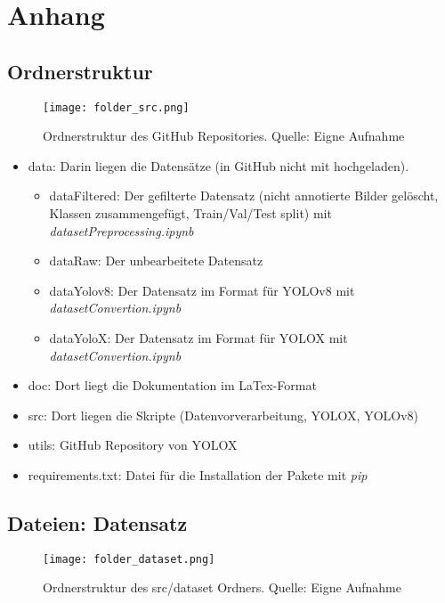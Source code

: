 \chapter{Anhang}\label{chap:appendix}
\section{Ordnerstruktur}
\begin{figure}[h]
	\centering
	\texttt{[image: folder\_src.png]}
	\caption[Ordnerstruktur des GitHub Repositories]{Ordnerstruktur des GitHub Repositories. Quelle: Eigne Aufnahme}
\end{figure}

\begin{itemize}
	\item data: Darin liegen die Datensätze (in GitHub nicht mit hochgeladen).
	\begin{itemize}
		\item dataFiltered: Der gefilterte Datensatz (nicht annotierte Bilder gelöscht, Klassen zusammengefügt, Train/Val/Test split) mit \textit{datasetPreprocessing.ipynb}
		\item dataRaw: Der unbearbeitete Datensatz \cite{datasetSelfDrivingCar}
		\item dataYolov8: Der Datensatz im Format für YOLOv8 mit \textit{datasetConvertion.ipynb}
		\item dataYoloX:  Der Datensatz im Format für YOLOX mit \textit{datasetConvertion.ipynb}
	\end{itemize}
	\item doc: Dort liegt die Dokumentation im LaTex-Format
	\item src: Dort liegen die Skripte (Datenvorverarbeitung, YOLOX, YOLOv8)
	\item utils: GitHub Repository von YOLOX
	\item requirements.txt: Datei für die Installation der Pakete mit \textit{pip}
\end{itemize}

\section{Dateien: Datensatz}
\begin{figure}[h]
	\centering
	\texttt{[image: folder\_dataset.png]}
	\caption[Ordnerstruktur des src/dataset Ordners.]{Ordnerstruktur des src/dataset Ordners. Quelle: Eigne Aufnahme}
\end{figure}

